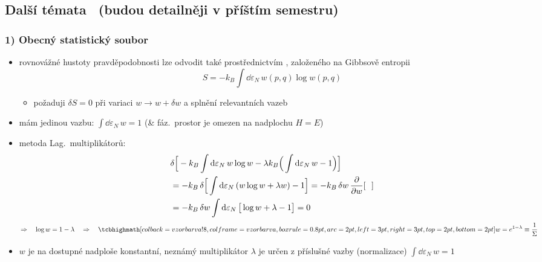 \subsection{Další témata \ {\normalfont\small(budou detailněji v příštím semestru)}}

\subsubsection*{1) Obecný statistický soubor}
\begin{itemize}
  \item rovnovážné hustoty pravděpodobnosti lze odvodit také prostřednictvím , založeného na Gibbsově entropii
  \[ S = -k_B\int\dd\varepsilon_N\,w(p,q)\log w(p,q) \]
  \begin{itemize}
    \item[--] požaduji $\delta S = 0$ při variaci $w\to w + \delta w$ a splnění relevantních vazeb
  \end{itemize}
\end{itemize}

\begin{priklad}
\begin{itemize}
  \item mám jedinou vazbu: \quad $\int\dd\varepsilon_N\,w = 1$ \quad (\& fáz.\ prostor je omezen na nadplochu $H = E$)
  \item metoda Lag.\ multiplikátorů:
  \begin{align*}
    &\delta\Big[-k_B\int\dd\varepsilon_N\,w\log w - \lambda k_B\Big(\int\dd\varepsilon_N\,w - 1\Big)\Big] \\
    &= -k_B\,\delta\Big[\int\dd\varepsilon_N\,(w\log w + \lambda w) - 1\Big] = -k_B\,\delta w\,\pdv{w}[\ \ ] \\
    &= -k_B\,\delta w\int\dd\varepsilon_N\,\big[\log w + \lambda - 1\big] = 0
  \end{align*}
  \[
    \Rightarrow\quad \log w = 1 - \lambda \quad\Rightarrow\quad \vzorec{w = e^{1-\lambda} \equiv \frac{1}{\Sigma}}
  \]
  \item $w$ je na dostupné nadploše konstantní, neznámý multiplikátor $\lambda$ je určen z příslušné vazby (normalizace) \quad $\int\dd\varepsilon_N\,w = 1$
\end{itemize}
\end{priklad}

